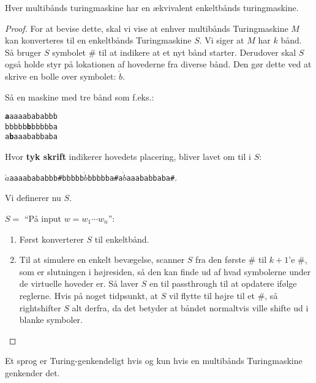 \begin{theorem}
  \label{teo:multitapeequiv}
  Hver multibånds turingmaskine har en ækvivalent enkeltbånds turingmaskine.
\end{theorem}

\begin{proof}
For at bevise dette, skal vi vise at enhver multibånds Turingmaskine $M$ kan konverteres til en enkeltbånds Turingmaskine $S$. Vi siger at $M$ har $k$ bånd. Så bruger $S$ symbolet \# til at indikere at et nyt bånd starter. Derudover skal $S$ også holde styr på lokationen af hovederne fra diverse bånd. Den gør dette ved at skrive en bolle over symbolet: $\mathring{b}$.

Så en maskine med tre bånd som f.eks.:\\
\begin{center}
\noindent
\texttt{\textbf{a}aaaabababbb}\\
\noindent
\texttt{bbbbb\textbf{b}bbbbba}\\
\noindent
\texttt{a\textbf{b}aaababbaba}\\
\end{center}
Hvor \textbf{tyk skrift} indikerer hovedets placering, bliver lavet om til i $S$:
\begin{center}
\texttt{$\mathring{a}$aaaabababbb\#bbbbb$\mathring{b}$bbbbba\#a$\mathring{b}$aaababbaba\#}.
\end{center}

Vi definerer nu $S$.

$S = $ ``På input $w = w_{1} \cdots w_{n}$'':
\begin{enumerate}
  \item Først konverterer $S$ til enkeltbånd.
  \item Til at simulere en enkelt bevægelse, scanner $S$ fra den første \# til $k+1$'e \#, som er slutningen i højresiden, så den kan finde ud af hvad symbolerne under de virtuelle hoveder er. Så laver $S$ en til passthrough til at opdatere ifølge reglerne. Hvis på noget tidpsunkt, at $S$ vil flytte til højre til et $\#$, så rightshifter $S$ alt derfra, da det betyder at båndet normaltvis ville shifte ud i blanke symboler.
\end{enumerate}

\end{proof}

\begin{corollary}
Et sprog er Turing-genkendeligt hvis og kun hvis en multibånds Turingmaskine genkender det.
\end{corollary}

